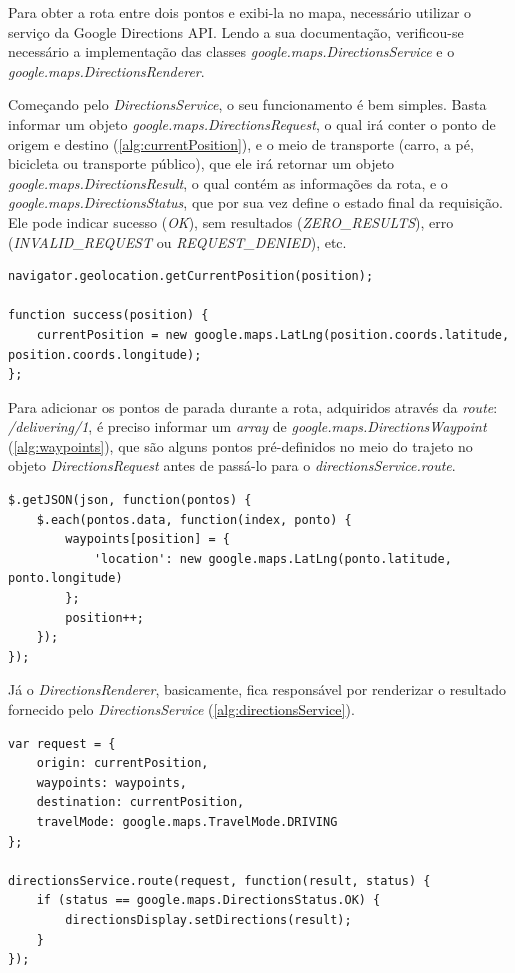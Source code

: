 Para obter a rota entre dois pontos e exibi-la no mapa, necessário utilizar o serviço da Google Directions API. Lendo a sua documentação, verificou-se necessário a implementação das classes \textit{google.maps.DirectionsService} e o \textit{google.maps.DirectionsRenderer}.

Começando pelo \textit{DirectionsService}, o seu funcionamento é bem simples. Basta informar um objeto \textit{google.maps.DirectionsRequest}, o qual irá conter o ponto de origem e destino (\autoref{alg:currentPosition}), e o meio de transporte (carro, a pé, bicicleta ou transporte público), que ele irá retornar um objeto \textit{google.maps.DirectionsResult}, o qual contém as informações da rota, e o \textit{google.maps.DirectionsStatus}, que por sua vez define o estado final da requisição. Ele pode indicar sucesso (\textit{OK}), sem resultados (\textit{ZERO\_RESULTS}), erro (\textit{INVALID\_REQUEST} ou \textit{REQUEST\_DENIED}), etc.

\begin{lstlisting}[caption={Delivery Routes - Current position}, style=htmlcssjs, label=alg:currentPosition]
navigator.geolocation.getCurrentPosition(position);

function success(position) {
    currentPosition = new google.maps.LatLng(position.coords.latitude, position.coords.longitude);
};
\end{lstlisting}

Para adicionar os pontos de parada durante a rota, adquiridos através da \textit{route}: \textit{/delivering/1}, é preciso informar um \textit{array} de \textit{google.maps.DirectionsWaypoint} (\autoref{alg:waypoints}), que são alguns pontos pré-definidos no meio do trajeto no objeto \textit{DirectionsRequest} antes de passá-lo para o \textit{directionsService.route}.

\begin{lstlisting}[caption={Delivery Routes - Waypoints}, style=htmlcssjs, label=alg:waypoints]
$.getJSON(json, function(pontos) {
    $.each(pontos.data, function(index, ponto) {
        waypoints[position] = {
            'location': new google.maps.LatLng(ponto.latitude, ponto.longitude)
        };
        position++;
    });
});
\end{lstlisting}

\newpage
Já o \textit{DirectionsRenderer}, basicamente, fica responsável por renderizar o resultado fornecido pelo \textit{DirectionsService} (\autoref{alg:directionsService}).

\begin{lstlisting}[caption={Delivery Routes - Directions Service}, style=htmlcssjs, label=alg:directionsService]
var request = {
    origin: currentPosition,
    waypoints: waypoints,
    destination: currentPosition,
    travelMode: google.maps.TravelMode.DRIVING
};

directionsService.route(request, function(result, status) {
    if (status == google.maps.DirectionsStatus.OK) {
        directionsDisplay.setDirections(result);
    }
});
\end{lstlisting}

